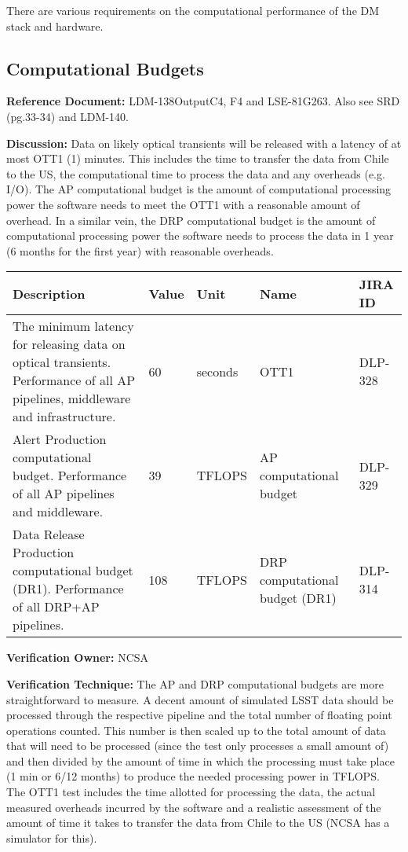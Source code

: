 \documentclass[DM,lsstdraft,toc]{lsstdoc}
\begin{document}
There are various requirements on the computational performance of the
DM stack and hardware.

\subsection{Computational Budgets}\label{computational-budgets}

\textbf{Reference Document:} LDM-138\textbar{}Output\textbar{}C4, F4 and
LSE-81\textbar{}G263. Also see SRD (pg.33-34) and LDM-140.

\textbf{Discussion:} Data on likely optical transients will be released
with a latency of at most OTT1 (1) minutes. This includes the time to
transfer the data from Chile to the US, the computational time to
process the data and any overheads (e.g. I/O). The AP computational
budget is the amount of computational processing power the software
needs to meet the OTT1 with a reasonable amount of overhead. In a
similar vein, the DRP computational budget is the amount of
computational processing power the software needs to process the data in
1 year (6 months for the first year) with reasonable overheads.

\begin{longtable}[]{@{}p{}llp{1.5in}l@{}}
\toprule
Description & Value & Unit & Name & JIRA ID\tabularnewline
\midrule
\endhead
The minimum latency for releasing data on optical transients.
Performance of all AP pipelines, middleware and infrastructure. & 60 &
seconds & OTT1 & DLP-328\tabularnewline
Alert Production computational budget. Performance of all AP pipelines
and middleware. & 39 & TFLOPS & AP computational budget &
DLP-329\tabularnewline
Data Release Production computational budget (DR1). Performance of all
DRP+AP pipelines. & 108 & TFLOPS & DRP computational budget (DR1) &
DLP-314\tabularnewline
\bottomrule
\end{longtable}

\textbf{Verification Owner:} NCSA

\textbf{Verification Technique:} The AP and DRP computational budgets
are more straightforward to measure. A decent amount of simulated LSST
data should be processed through the respective pipeline and the total
number of floating point operations counted. This number is then scaled
up to the total amount of data that will need to be processed (since the
test only processes a small amount of) and then divided by the amount of
time in which the processing must take place (1 min or 6/12 months) to
produce the needed processing power in TFLOPS. The OTT1 test includes
the time allotted for processing the data, the actual measured overheads
incurred by the software and a realistic assessment of the amount of
time it takes to transfer the data from Chile to the US (NCSA has a
simulator for this).
\end{document}
